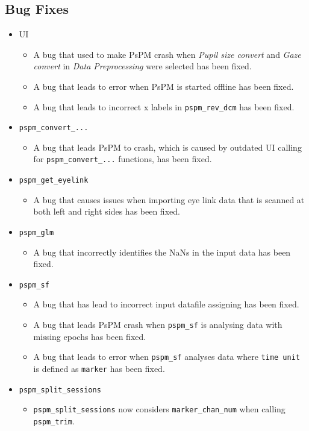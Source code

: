 \documentclass[english]{article}
\numberwithin{equation}{section}
\numberwithin{figure}{section}
\begin{document}
\subsection*{Bug Fixes}
	\begin{itemize}
		\item UI
		\begin{itemize}
			\item A bug that used to make PsPM crash when \textit{Pupil size convert} and \textit{Gaze convert} in \textit{Data Preprocessing} were selected has been fixed.
			\item A bug that leads to error when PsPM is started offline has been fixed.
			\item A bug that leads to incorrect x labels in \texttt{pspm\_rev\_dcm} has been fixed.
		\end{itemize}
		\item \texttt{pspm\_convert\_...}
		\begin{itemize}
			\item A bug that leads PsPM to crash, which is caused by outdated UI calling for \texttt{pspm\_convert\_...} functions, has been fixed.
		\end{itemize}
		\item \texttt{pspm\_get\_eyelink}
		\begin{itemize}
			\item A bug that causes issues when importing eye link data that is scanned at both left and right sides has been fixed.
		\end{itemize}
		\item \texttt{pspm\_glm}
		\begin{itemize}
			\item A bug that incorrectly identifies the NaNs in the input data has been fixed.
		\end{itemize}
		\item \texttt{pspm\_sf}
		\begin{itemize}
			\item A bug that has lead to incorrect input datafile assigning has been fixed.
			\item A bug that leads PsPM crash when \texttt{pspm\_sf} is analysing data with missing epochs has been fixed.
			\item A bug that leads to error when \texttt{pspm\_sf} analyses data where \texttt{time unit} is defined as \texttt{marker} has been fixed.
		\end{itemize}
		\item \texttt{pspm\_split\_sessions}
		\begin{itemize}
			\item \texttt{pspm\_split\_sessions} now considers \texttt{marker\_chan\_num} when calling \texttt{pspm\_trim}.
		\end{itemize}
	\end{itemize}
	
\end{document}
